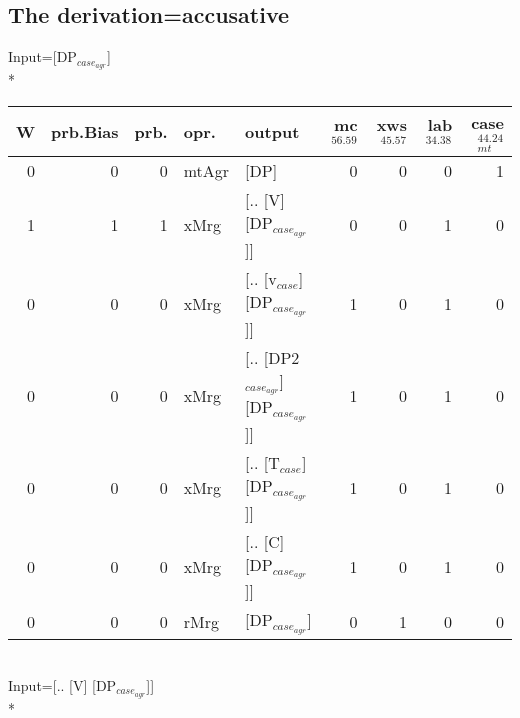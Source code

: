 \subsection{The derivation=accusative}
\begingroup\scriptsize Input=[DP$_{case_{agr}}$]\\*
\begin{tabularx}{\linewidth}{rrrlXrrrr}
\hline
   W &   prb.Bias &   prb. & opr.    & output                            &   mc$^{56.59}$ &   xws$^{45.57}$ &   lab$^{34.38}$ &   case$_{mt}^{44.24}$ \\
\hline
   0 &       0 &   0 & mtAgr & [DP]                              &            0 &             0 &             0 &                 1 \\
   1 &       1 &   1 & xMrg  & [.. [V] [DP$_{case_{agr}}$]]            &            0 &             0 &             1 &                 0 \\
   0 &       0 &   0 & xMrg  & [.. [v$_{case}$] [DP$_{case_{agr}}$]]       &            1 &             0 &             1 &                 0 \\
   0 &       0 &   0 & xMrg  & [.. [DP2$_{case_{agr}}$] [DP$_{case_{agr}}$]] &            1 &             0 &             1 &                 0 \\
   0 &       0 &   0 & xMrg  & [.. [T$_{case}$] [DP$_{case_{agr}}$]]       &            1 &             0 &             1 &                 0 \\
   0 &       0 &   0 & xMrg  & [.. [C] [DP$_{case_{agr}}$]]            &            1 &             0 &             1 &                 0 \\
   0 &       0 &   0 & rMrg  & [DP$_{case_{agr}}$]                     &            0 &             1 &             0 &                 0 \\
\hline
\end{tabularx}\endgroup\\
\begingroup\scriptsize Input=[.. [V] [DP$_{case_{agr}}$]]\\*
